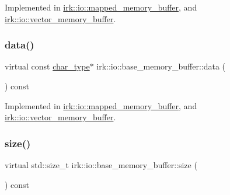 Implemented in \mbox{\hyperlink{classirk_1_1io_1_1mapped__memory__buffer_a2b731cf50320c20fb271bdd5c6f384c4}{irk\+::io\+::mapped\+\_\+memory\+\_\+buffer}}, and \mbox{\hyperlink{classirk_1_1io_1_1vector__memory__buffer_a28ddafbb2610a463d13dc7fe5cf0708f}{irk\+::io\+::vector\+\_\+memory\+\_\+buffer}}.

\mbox{\label{classirk_1_1io_1_1base__memory__buffer_a87bbff1a6d211e26f0c0aa924a980b9e}} 
\subsubsection{\texorpdfstring{data()}{data()}\hspace{0.1cm}{\footnotesize\ttfamily [2/2]}}
{\footnotesize\ttfamily virtual const \mbox{\hyperlink{classirk_1_1io_1_1base__memory__buffer_a1b539180df4274dd4ad0402a0ac821ec}{char\+\_\+type}}$\ast$ irk\+::io\+::base\+\_\+memory\+\_\+buffer\+::data (\begin{DoxyParamCaption}{ }\end{DoxyParamCaption}) const\hspace{0.3cm}{\ttfamily [pure virtual]}}



Implemented in \mbox{\hyperlink{classirk_1_1io_1_1mapped__memory__buffer_ab4bbb25488358a3d527d45d16a845fb6}{irk\+::io\+::mapped\+\_\+memory\+\_\+buffer}}, and \mbox{\hyperlink{classirk_1_1io_1_1vector__memory__buffer_ad0d18022442c081ac51abb8da8b68e54}{irk\+::io\+::vector\+\_\+memory\+\_\+buffer}}.

\mbox{\label{classirk_1_1io_1_1base__memory__buffer_ae634ab934981e7e4baf5e1e67ef3b006}} 
\subsubsection{\texorpdfstring{size()}{size()}}
{\footnotesize\ttfamily virtual std\+::size\+\_\+t irk\+::io\+::base\+\_\+memory\+\_\+buffer\+::size (\begin{DoxyParamCaption}{ }\end{DoxyParamCaption}) const\hspace{0.3cm}{\ttfamily [pure virtual]}}




